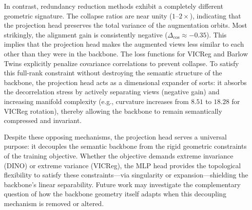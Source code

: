\documentclass{article}
\theoremstyle{plain}
\theoremstyle{definition}
\theoremstyle{remark}
\begin{document}
In contrast, redundancy reduction methods exhibit a completely different geometric signature. The collapse ratios are near unity ($1$--$2\times$), indicating that the projection head preserves the total variance of the augmentation orbits. Most strikingly, the alignment gain is consistently negative ($\Delta_{\text{cos}} \approx -0.35$). This implies that the projection head makes the augmented views less similar to each other than they were in the backbone. The loss functions for VICReg and Barlow Twins explicitly penalize covariance correlations to prevent collapse. To satisfy this full-rank constraint without destroying the semantic structure of the backbone, the projection head acts as a dimensional expander of sorts: it absorbs the decorrelation stress by actively separating views (negative gain) and increasing manifold complexity (e.g., curvature increases from $8.51$ to $18.28$ for VICReg rotation), thereby allowing the backbone to remain semantically compressed and invariant.

Despite these opposing mechanisms, the projection head serves a universal purpose: it decouples the semantic backbone from the rigid geometric constraints of the training objective. Whether the objective demands extreme invariance (DINO) or extreme variance (VICReg), the MLP head provides the topological flexibility to satisfy these constraints---via singularity or expansion---shielding the backbone's linear separability. Future work may investigate the complementary question of how the backbone geometry itself adapts when this decoupling mechanism is removed or altered.
\end{document}
